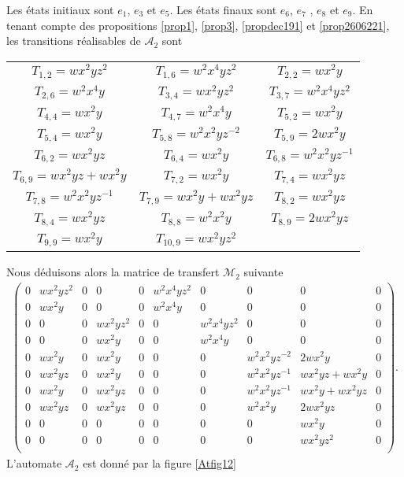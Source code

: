  Les états initiaux sont $e_{1}$, $e_{3}$ et $e_{5}$. Les  états 
  finaux sont  $e_{6}$, $e_{7}$ , $e_{8}$ et  $e_{9}$.
 En tenant compte des propositions \ref{prop1}, \ref{prop3}, \ref{propdec191} et  \ref{prop2606221}, les transitions réalisables de $\mathcal{A}_{2}$ sont 
\begin{longtable}{|c|c|c|} 
\hline
$T_{1,2} =  wx^{2}yz^{2}$& $T_{1,6}  =  w^{2}x^{4}yz^{2}$& $T_{2,2}  =  wx^{2}y$\\ 
$T_{2,6}  =  w^{2}x^{4}y$&$T_{3,4}  =  wx^{2}yz^{2}$& $T_{3,7}  =  w^{2}x^{4}yz^{2}$\\ 
$T_{4,4}  =  wx^{2}y$&$T_{4,7}  =  w^{2}x^{4}y$& $T_{5,2}  =  wx^{2}y$\\ 
$T_{5,4} =  wx^{2}y$&$T_{5,8}  =  w^{2}x^{2}yz^{-2}$&$T_{5,9}  = 2wx^{2}y$\\ 
$T_{6,2}  =  wx^{2}yz$&$T_{6,4}  =  wx^{2}y$& $T_{6,8}  =  w^{2}x^{2}yz^{-1}$\\ 
$T_{6,9}  =  wx^{2}yz + wx^{2}y$&$T_{7,2}  =  wx^{2}y$&$T_{7,4} =  wx^{2}yz$\\ 
$T_{7,8} =  w^{2}x^{2}yz^{-1}$&$T_{7,9} =  wx^{2}y + wx^{2}yz$&$T_{8,2}  =  wx^{2}yz$\\ 
$T_{8,4}  =  wx^{2}yz$&$T_{8,8}  =  w^{2}x^{2}y$&$T_{8,9}  =  2wx^{2}yz$\\ 
$T_{9,9}  =  wx^{2}y$&$T_{10,9} =  wx^{2}yz^{2}$&\\ 
\hline
\end{longtable} 
Nous déduisons alors la matrice de transfert $\mathcal{M}_{2}$ suivante
\begin{eqnarray*}
\begin{pmatrix}
0 & wx^{2}yz^{2} & 0 & 0 & 0 & w^{2}x^{4}yz^{2} & 0 & 0 &0 & 0\\
0 & wx^{2}y & 0 & 0 & 0 & w^{2}x^{4}y & 0 & 0 & 0 & 0\\
0 & 0 & 0 & wx^{2}yz^{2} & 0 & 0 & w^{2}x^{4}yz^{2} & 0 & 0 & 0\\
0 & 0 & 0 &  wx^{2}y & 0 & 0 & w^{2}x^{4}y & 0 & 0 & 0\\
0 & wx^{2}y & 0 & wx^{2}y & 0 & 0 & 0 & w^{2}x^{2}yz^{-2} &  2wx^{2}y & 0\\
0 & wx^{2}yz & 0 & wx^{2}y & 0 & 0 & 0 & w^{2}x^{2}yz^{-1} & wx^{2}yz + wx^{2}y & 0\\
0 & wx^{2}y & 0 & wx^{2}yz & 0 & 0 & 0 & w^{2}x^{2}yz^{-1} & wx^{2}y + wx^{2}yz & 0\\
0 & wx^{2}yz & 0 & wx^{2}yz & 0 & 0 & 0 & w^{2}x^{2}y & 2wx^{2}yz & 0\\
0 & 0 & 0 & 0 & 0 & 0 & 0 & 0 & wx^{2}y & 0\\
0 & 0 & 0 & 0 & 0 & 0 & 0 & 0 & wx^{2}yz^{2} & 0\\
\end{pmatrix}.
\end{eqnarray*}
L'automate $\mathcal{A}_{2}$ est donné par la figure \ref{Atfig12}


